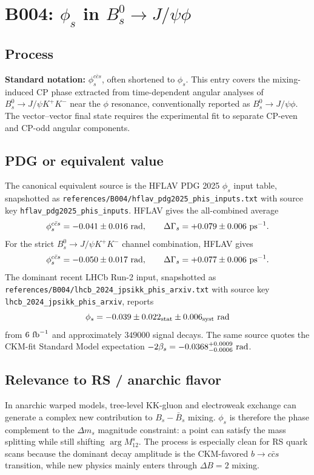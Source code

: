 
\section{B004: \(\phi_s\) in \(B_s^0\to J/\psi\phi\)}

\subsection*{Process}
\textbf{Standard notation:} \(\phi_s^{c\bar c s}\), often shortened to
\(\phi_s\).  This entry covers the mixing-induced CP phase extracted from
time-dependent angular analyses of \(B_s^0\to J/\psi K^+K^-\) near the
\(\phi\) resonance, conventionally reported as \(B_s^0\to J/\psi\phi\).
The vector--vector final state requires the experimental fit to separate
CP-even and CP-odd angular components.

\subsection*{PDG or equivalent value}
The canonical equivalent source is the HFLAV PDG 2025 \(\phi_s\) input table,
snapshotted as \texttt{references/B004/hflav\_pdg2025\_phis\_inputs.txt} with
source key \texttt{hflav\_pdg2025\_phis\_inputs}.  HFLAV gives the
all-combined average
\[
  \phi_s^{c\bar c s}=-0.041\pm0.016~{\rm rad},
  \qquad
  \Delta\Gamma_s=+0.079\pm0.006~{\rm ps}^{-1}.
\]
For the strict \(B_s^0\to J/\psi K^+K^-\) channel combination, HFLAV gives
\[
  \phi_s^{c\bar c s}=-0.050\pm0.017~{\rm rad},
  \qquad
  \Delta\Gamma_s=+0.077\pm0.006~{\rm ps}^{-1}.
\]
The dominant recent LHCb Run-2 input, snapshotted as
\texttt{references/B004/lhcb\_2024\_jpsikk\_phis\_arxiv.txt} with source key
\texttt{lhcb\_2024\_jpsikk\_phis\_arxiv}, reports
\[
  \phi_s=-0.039\pm0.022_{\rm stat}\pm0.006_{\rm syst}~{\rm rad}
\]
from \(6~{\rm fb}^{-1}\) and approximately \(349000\) signal decays.  The same
source quotes the CKM-fit Standard Model expectation
\(-2\beta_s=-0.0368^{+0.0009}_{-0.0006}~{\rm rad}\).

\subsection*{Relevance to RS / anarchic flavor}
In anarchic warped models, tree-level KK-gluon and electroweak exchange can
generate a complex new contribution to \(B_s-\bar B_s\) mixing.  \(\phi_s\) is
therefore the phase complement to the \(\Delta m_s\) magnitude constraint: a
point can satisfy the mass splitting while still shifting \(\arg M_{12}^s\).
The process is especially clean for RS quark scans because the dominant decay
amplitude is the CKM-favored \(b\to c\bar c s\) transition, while new physics
mainly enters through \(\Delta B=2\) mixing.

